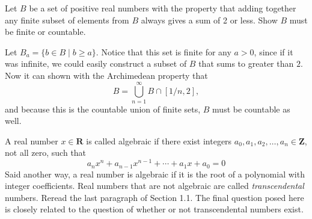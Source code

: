 \begin{solution}
\end{solution}

\begin{exercise}
  Let $B$ be a set of positive real numbers with the property that adding together any finite subset of elements from $B$ always gives a sum of 2 or less. Show $B$ must be finite or countable.
\end{exercise}

\begin{solution}
  Let $B_a = \{b\in B \mid b\geq a\}$. Notice that this set is finite for any $a>0$, since if it was infinite, we could easily construct a subset of $B$ that sums to greater than $2$. Now it can shown with the Archimedean property that $$B=\bigcup^\infty_{n=1} B\cap[1/n, 2],$$ and because this is the countable union of finite sets, $B$ must be countable as well.
\end{solution}

\begin{exercise}
  A real number $x \in \mathbf{R}$ is called algebraic if there exist integers $a_{0}, a_{1}, a_{2}, \ldots, a_{n} \in \mathbf{Z}$, not all zero, such that
  $$
  a_{n} x^{n}+a_{n-1} x^{n-1}+\cdots+a_{1} x+a_{0}=0
  $$
  Said another way, a real number is algebraic if it is the root of a polynomial with integer coefficients. Real numbers that are not algebraic are called \emph{transcendental} numbers. Reread the last paragraph of Section 1.1. The final question posed here is closely related to the question of whether or not transcendental numbers exist.

\end{exercise}

